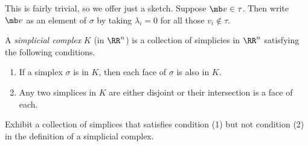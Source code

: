\begin{solution}
  This is fairly trivial, so we offer just a sketch. Suppose $\mb v \in \tau$.
  Then write $\mb v$ as an element of $\sigma$ by taking $\lambda_i = 0$ for all
  those $v_i \not \in \tau$.
\end{solution}
\begin{definition}
  A \emph{simplicial complex} $K$ (in $\RR^n$) is a collection of simplicies in
  $\RR^n$ satisfying the following conditions.
  \begin{enumerate}[label=\arabic*.]
    \item If a simplex $\sigma$ is in $K$, then each face of $\sigma$ is also in
      $K$.
    \item Any two simplices in $K$ are either disjoint or their intersection is
      a face of each.
  \end{enumerate}
\end{definition}
\begin{problem}[15.13]
  Exhibit a collection of simplices that satisfies condition (1) but not
  condition (2) in the definition of a simplicial complex.
\end{problem}
